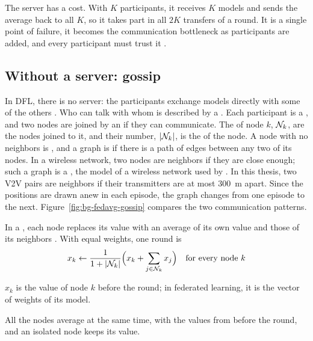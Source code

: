 The server has a cost. With $K$ participants, it receives $K$ models and sends the average back to all $K$,
so it takes part in all $2K$ transfers of a round. It is a single point of failure, it becomes the
communication bottleneck as participants are added, and every participant must trust it
\cite{kairouz+21advances,ge+24dfl}.

\subsection{Without a server: gossip}
\label{sec:bg-dfl}

In \ac{DFL}, there is no server: the participants exchange models directly with some of the others
\cite{kairouz+21advances,ge+24dfl}. Who can talk with whom is described by a . Each
participant is a , and two nodes are joined by an  if they can communicate. The
 of node $k$, $\mathcal{N}_k$, are the nodes joined to it, and their number, $|\mathcal{N}_k|$, is the
 of the node. A node with no neighbors is , and a graph is
 if there is a path of edges between any two of its nodes. In a wireless network, two
nodes are neighbors if they are close enough; such a graph is a , the model
of a wireless network used by \citet{boyd+06gossip}. In this thesis, two \ac{V2V} pairs are neighbors if their
transmitters are at most \SI{300}{\meter} apart. Since the positions are drawn anew in each episode, the
graph changes from one episode to the next. Figure~\ref{fig:bg-fedavg-gossip} compares the two
communication patterns.

In a , each node replaces its value with an average of its own value and those of
its neighbors \cite{boyd+06gossip}. With equal weights, one round is
\begin{equation}
  x_k \leftarrow \frac{1}{1 + |\mathcal{N}_k|} \Bigl( x_k + \sum_{j \in \mathcal{N}_k} x_j \Bigr)
  \quad \text{for every node } k \label{eq:bg-gossip}
\end{equation}
\begin{wherelist}
  \item $x_k$ is the value of node $k$ before the round; in federated learning, it is the vector of weights
    of its model.
\end{wherelist}
All the nodes average at the same time, with the values from before the round, and an isolated node keeps
its value.

